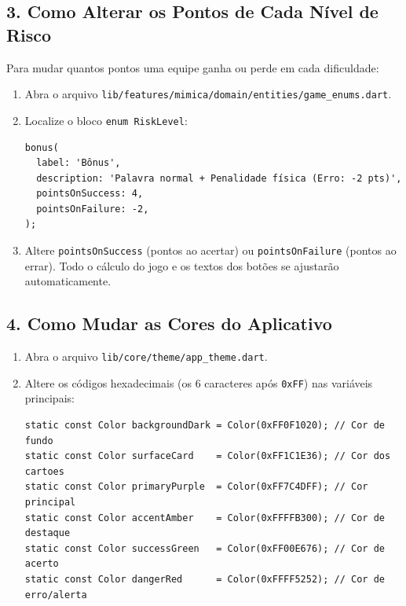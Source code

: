 \documentclass[12pt,a4paper]{article}
\begin{document}
\subsection{3. Como Alterar os Pontos de Cada Nível de Risco}
Para mudar quantos pontos uma equipe ganha ou perde em cada dificuldade:
\begin{enumerate}
  \item Abra o arquivo \texttt{lib/features/mimica/domain/entities/game\_enums.dart}.
  \item Localize o bloco \texttt{enum RiskLevel}:
\begin{lstlisting}
bonus(
  label: 'Bônus',
  description: 'Palavra normal + Penalidade física (Erro: -2 pts)',
  pointsOnSuccess: 4,
  pointsOnFailure: -2,
);
\end{lstlisting}
  \item Altere \texttt{pointsOnSuccess} (pontos ao acertar) ou \texttt{pointsOnFailure} (pontos ao errar). Todo o cálculo do jogo e os textos dos botões se ajustarão automaticamente.
\end{enumerate}

\subsection{4. Como Mudar as Cores do Aplicativo}
\begin{enumerate}
  \item Abra o arquivo \texttt{lib/core/theme/app\_theme.dart}.
  \item Altere os códigos hexadecimais (os 6 caracteres após \texttt{0xFF}) nas variáveis principais:
\begin{lstlisting}
static const Color backgroundDark = Color(0xFF0F1020); // Cor de fundo
static const Color surfaceCard    = Color(0xFF1C1E36); // Cor dos cartoes
static const Color primaryPurple  = Color(0xFF7C4DFF); // Cor principal
static const Color accentAmber    = Color(0xFFFFB300); // Cor de destaque
static const Color successGreen   = Color(0xFF00E676); // Cor de acerto
static const Color dangerRed      = Color(0xFFFF5252); // Cor de erro/alerta
\end{lstlisting}
\end{enumerate}
\end{document}
